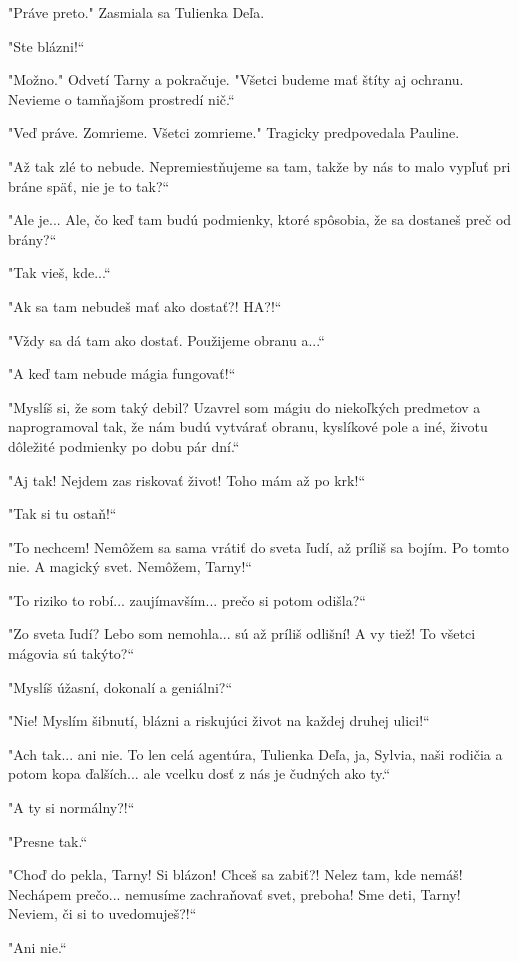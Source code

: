 \documentclass{book}
\begin{document}
"$ $Práve preto."$ $ Zasmiala sa Tulienka Deľa.

"$ $Ste blázni!“

"$ $Možno."$ $ Odvetí Tarny a pokračuje. "$ $Všetci budeme mať štíty aj ochranu. Nevieme o tamňajšom prostredí nič.“

"$ $Veď práve. Zomrieme. Všetci zomrieme."$ $ Tragicky predpovedala Pauline.

"$ $Až tak zlé to nebude. Nepremiestňujeme sa tam, takže by nás to malo vypľuť pri bráne späť, nie je to tak?“

"$ $Ale je... Ale, čo keď tam budú podmienky, ktoré spôsobia, že sa dostaneš preč od brány?“

"$ $Tak vieš, kde...“

"$ $Ak sa tam nebudeš mať ako dostať?! HA?!“

"$ $Vždy sa dá tam ako dostať. Použijeme obranu a...“

"$ $A keď tam nebude mágia fungovať!“

"$ $Myslíš si, že som taký debil? Uzavrel som mágiu do niekoľkých predmetov a naprogramoval tak, že nám budú vytvárať obranu, kyslíkové pole a iné, životu dôležité podmienky po dobu pár dní.“

"$ $Aj tak! Nejdem zas riskovať život! Toho mám až po krk!“

"$ $Tak si tu ostaň!“

"$ $To nechcem! Nemôžem sa sama vrátiť do sveta ľudí, až príliš sa bojím. Po tomto nie. A magický svet. Nemôžem, Tarny!“

"$ $To riziko to robí... zaujímavším... prečo si potom odišla?“

"$ $Zo sveta ľudí? Lebo som nemohla... sú až príliš odlišní! A vy tiež! To všetci mágovia sú takýto?“

"$ $Myslíš úžasní, dokonalí a geniálni?“

"$ $Nie! Myslím šibnutí, blázni a riskujúci život na každej druhej ulici!“

"$ $Ach tak... ani nie. To len celá agentúra, Tulienka Deľa, ja, Sylvia, naši rodičia a potom kopa ďalších... ale vcelku dosť z nás je čudných ako ty.“

"$ $A ty si normálny?!“

"$ $Presne tak.“

"$ $Choď do pekla, Tarny! Si blázon! Chceš sa zabiť?! Nelez tam, kde nemáš! Nechápem prečo... nemusíme zachraňovať svet, preboha! Sme deti, Tarny! Neviem, či si to uvedomuješ?!“

"$ $Ani nie.“
\end{document}
